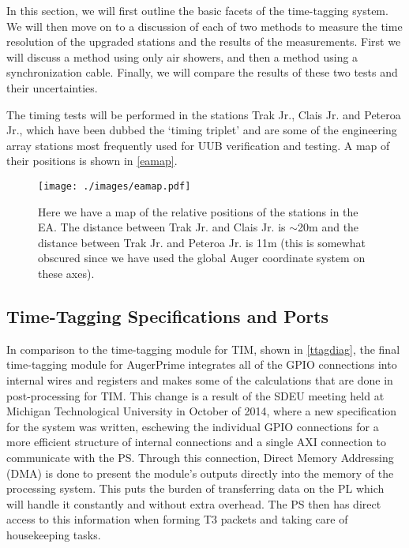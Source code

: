 In this section, we will first outline the basic facets of the time-tagging system. We will then move on to a discussion of each of two methods to measure the time resolution of the upgraded stations and the results of the measurements. First we will discuss a method using only air showers, and then a method using a synchronization cable. Finally, we will compare the results of these two tests and their uncertainties. 

The timing tests will be performed in the stations Trak Jr., Clais Jr. and Peteroa Jr., which have been dubbed the `timing triplet' and are some of the engineering array stations most frequently used for UUB verification and testing. A map of their positions is shown in \autoref{eamap}.
\begin{figure}[H]
\centering
\texttt{[image: ./images/eamap.pdf]}
\caption[Timing Triplet Map]{Here we have a map of the relative positions of the stations in the EA. The distance between  Trak Jr. and Clais Jr. is $\sim$20m and the distance between Trak Jr. and Peteroa Jr. is 11m (this is somewhat obscured since we have used the global Auger coordinate system on these axes).}
\label{eamap}
\end{figure}

\subsection{Time-Tagging Specifications and Ports} %
\label{ttagspec}
In comparison to the time-tagging module for TIM, shown in \autoref{ttagdiag}, the final time-tagging module for AugerPrime integrates all of the GPIO connections into internal wires and registers and makes some of the calculations that are done in post-processing for TIM. This change is a result of the SDEU meeting held at Michigan Technological University in October of 2014, where a new specification for the system was written, eschewing the individual GPIO connections for a more efficient structure of internal connections and a single AXI connection to communicate with the PS. Through this connection, Direct Memory Addressing (DMA) is done to present the module's outputs directly into the memory of the processing system. This puts the burden of transferring data on the PL which will handle it constantly and without extra overhead. The PS then has direct access to this information when forming T3 packets and taking care of housekeeping tasks.

